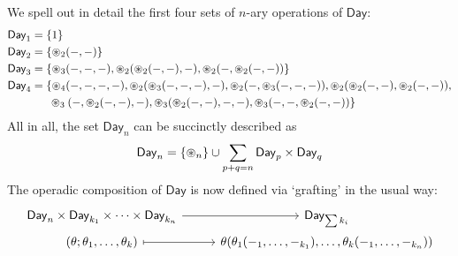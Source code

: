 \documentclass[11pt]{amsart}
\begin{document}
\begin{remark}%
	We spell out in detail the first four sets of $n$-ary operations of $\mathsf{Day}$:
	\begin{align*}
		\mathsf{Day}_{1} & = \{1\}                                                                                                                                                            \\
		\mathsf{Day}_{2} & = \{\otimesDayN{2}(-,-)\}                                                                                                                                            \\
		\mathsf{Day}_{3} & = \{\otimesDayN{3}(-,-,-),\otimesDayN{2}(\otimesDayN{2}(-,-),-),\otimesDayN{2}(-,\otimesDayN{2}(-,-))\}                                                              \\
		\mathsf{Day}_{4} & = \{\otimesDayN{4}(-,-,-,-),\otimesDayN{2}(\otimesDayN{3}(-,-,-),-),\otimesDayN{2}(-,\otimesDayN{3}(-,-,-)),\otimesDayN{2}(\otimesDayN{2}(-,-),\otimesDayN{2}(-,-)), \\\
		               & \phantom{=\{} \otimesDayN{3}(-,\otimesDayN{2}(-,-),-),\otimesDayN{3}(\otimesDayN{2}(-,-),-,-),\otimesDayN{3}(-,-,\otimesDayN{2}(-,-))\}
	\end{align*}
	All in all, the set $\mathsf{Day}_n$ can be succinctly described as
	\[\mathsf{Day}_n = \{\mathbin{\circledast}_{n}\} \cup \sum_{p+q=n} \mathsf{Day}_p \times \mathsf{Day}_q \]
	The operadic composition of $\mathsf{Day}$ is now defined via `grafting' in the usual way:
	\[ 
		\begin{tikzcd}[row sep=0.0em, column sep=2.7em,  ampersand replacement=\&]
			\mathsf{Day}_{n}\times\mathsf{Day}_{k_{1}}\times\cdots\times\mathsf{Day}_{k_{n}}
			\arrow[r]
			\&
			\mathsf{Day}_{\sum k_i}
			\\
			{(\theta;\theta_{1},\ldots,\theta_{k})}
			\arrow[r, mapsto]
			\&
			{\theta(\theta_{1}(-_{1},\ldots,-_{k_{1}}),\ldots,\theta_{k}(-_{1},\ldots,-_{k_{n}}))}
		\end{tikzcd}
		\]
\end{remark}
\end{document}
